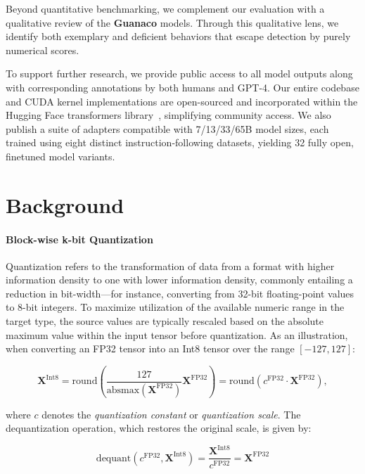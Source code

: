 Beyond quantitative benchmarking, we complement our evaluation with a qualitative review of the \textbf{Guanaco} models. Through this qualitative lens, we identify both exemplary and deficient behaviors that escape detection by purely numerical scores.

To support further research, we provide public access to all model outputs along with corresponding annotations by both humans and GPT-4. Our entire codebase and CUDA kernel implementations are open-sourced and incorporated within the Hugging Face transformers library~\citep{wolf2019huggingface}, simplifying community access. We also publish a suite of adapters compatible with 7/13/33/65B model sizes, each trained using eight distinct instruction-following datasets, yielding 32 fully open, finetuned model variants.

\section{Background}
\paragraph{Block-wise k-bit Quantization} Quantization refers to the transformation of data from a format with higher information density to one with lower information density, commonly entailing a reduction in bit-width—for instance, converting from 32-bit floating-point values to 8-bit integers. To maximize utilization of the available numeric range in the target type, the source values are typically rescaled based on the absolute maximum value within the input tensor before quantization. As an illustration, when converting an FP32 tensor into an Int8 tensor over the range $[-127, 127]$:

\begin{equation}
    \mathbf{X}^{ \text{Int8}} = \text{round}\left( \frac{127}{{\text{absmax}}(\mathbf{X}^{{\text{FP32}}})}\mathbf{X}^{{\text{FP32}}} \right) = \text{round}(c^{\text{FP32}}\cdot \mathbf{X}^{{\text{FP32}}}),
\end{equation}

where $c$ denotes the {\em quantization constant} or {\em quantization scale}. The dequantization operation, which restores the original scale, is given by:

\begin{equation}
    \text{dequant}(c^{\text{FP32}}, \mathbf{X}^{\text{Int8}}) = \frac{\mathbf{X}^{\text{Int8}}}{c^{\text{FP32}}} = \mathbf{X}^{\text{FP32}}
\end{equation}

